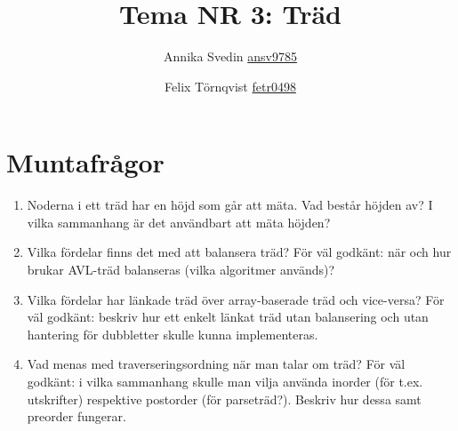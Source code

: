 \documentclass[a5paper,10pt,oneside]{article}
\title{Tema NR 3: Träd}
\author{Annika Svedin \url{ansv9785} \and Felix Törnqvist \url{fetr0498}}
\begin{document}
\maketitle

\section*{Muntafrågor}

\begin{enumerate}

\item

Noderna i ett träd har en höjd som går att mäta. Vad består höjden av? I vilka sammanhang är det användbart att mäta höjden?



\item
Vilka fördelar finns det med att balansera träd? För väl godkänt: när och hur brukar AVL-träd balanseras (vilka algoritmer används)?

\item
Vilka fördelar har länkade träd över array-baserade träd och vice-versa? För väl godkänt: beskriv hur ett enkelt länkat träd utan balansering och utan hantering för dubbletter skulle kunna implementeras.

\item
Vad menas med traverseringsordning när man talar om träd? För väl godkänt: i vilka sammanhang skulle man vilja använda inorder (för t.ex. utskrifter) respektive postorder (för parseträd?). Beskriv hur dessa samt preorder fungerar.

\end{enumerate}
\end{document}
